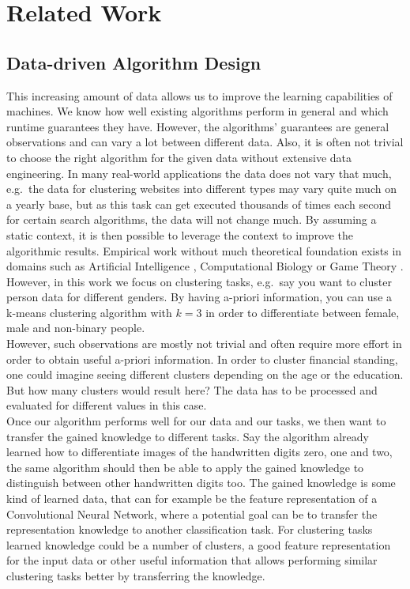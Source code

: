 \chapter{Related Work}
\label{chapter:relatedwork}

\section{Data-driven Algorithm Design}

This increasing amount of data allows us to improve the learning capabilities of machines. We know how well existing algorithms perform in general and which runtime guarantees they have. However, the algorithms' guarantees are general observations and can vary a lot between different data. Also, it is often not trivial to choose the right algorithm for the given data without extensive data engineering. In many real-world applications the data does not vary that much, e.g.\ the data for clustering websites into different types may vary quite much on a yearly base, but as this task can get executed thousands of times each second for certain search algorithms, the data will not change much. By assuming a static context, it is then possible to leverage the context to improve the algorithmic results. Empirical work without much theoretical foundation exists in domains such as Artificial Intelligence \cite{Xu:2008:SPA:1622673.1622687}, Computational Biology \cite{deblasio2018adaptive} or Game Theory \cite{likhodedov2004methods}. However, in this work we focus on clustering tasks, e.g.\ say you want to cluster person data for different genders. By having a-priori information, you can use a k-means clustering algorithm with $k = 3$ in order to differentiate between female, male and non-binary people.\\

However, such observations are mostly not trivial and often require more effort in order to obtain useful a-priori information. In order to cluster financial standing, one could imagine seeing different clusters depending on the age or the education. But how many clusters would result here? The data has to be processed and evaluated for different values in this case.\\

Once our algorithm performs well for our data and our tasks, we then want to transfer the gained knowledge to different tasks. Say the algorithm already learned how to differentiate images of the handwritten digits zero, one and two, the same algorithm should then be able to apply the gained knowledge to distinguish between other handwritten digits too. The gained knowledge is some kind of learned data, that can for example be the feature representation of a Convolutional Neural Network, where a potential goal can be to transfer the representation knowledge to another classification task. For clustering tasks learned knowledge could be a number of clusters, a good feature representation for the input data or other useful information that allows performing similar clustering tasks better by transferring the knowledge.\\

